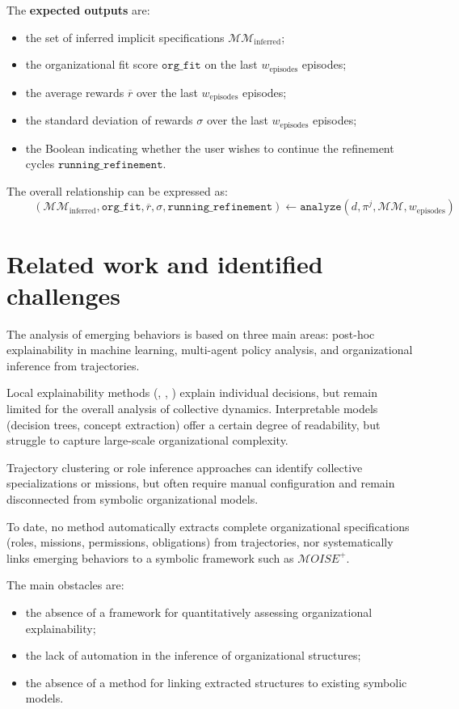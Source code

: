 \noindent
The \textbf{expected outputs} are:
\begin{itemize}
  \item the set of inferred implicit specifications $\mathcal{MM}_{\text{inferred}}$;
  \item the organizational fit score $\texttt{org\_fit}$ on the last $w_{\text{episodes}}$ episodes;
  \item the average rewards $\overline{r}$ over the last $w_{\text{episodes}}$ episodes;
  \item the standard deviation of rewards $\sigma$ over the last $w_{\text{episodes}}$ episodes;
  \item the Boolean indicating whether the user wishes to continue the refinement cycles $\texttt{running\_refinement}$.
\end{itemize}

\noindent The overall relationship can be expressed as:
\[
  \hspace{1cm}(\mathcal{MM}_{\text{inferred}}, \texttt{org\_fit}, \overline{r}, \sigma, \texttt{running\_refinement}) \gets \texttt{analyze}(d, \pi^j, \mathcal{MM}, w_{\text{episodes}})
\]

\section{Related work and identified challenges}

The analysis of emerging behaviors is based on three main areas: post-hoc explainability in machine learning, multi-agent policy analysis, and organizational inference from trajectories.

Local explainability methods (, , ) explain individual decisions, but remain limited for the overall analysis of collective dynamics. Interpretable models (decision trees, concept extraction) offer a certain degree of readability, but struggle to capture large-scale organizational complexity.

Trajectory clustering or role inference approaches can identify collective specializations or missions, but often require manual configuration and remain disconnected from symbolic organizational models.

To date, no method automatically extracts complete organizational specifications (roles, missions, permissions, obligations) from trajectories, nor systematically links emerging behaviors to a symbolic framework such as $\mathcal{M}OISE^+$.

The main obstacles are:
\begin{itemize}
  \item the absence of a framework for quantitatively assessing organizational explainability;
  \item the lack of automation in the inference of organizational structures;
  \item the absence of a method for linking extracted structures to existing symbolic models.
\end{itemize}


